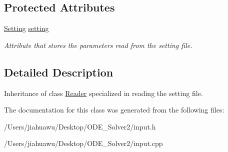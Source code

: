 \subsection*{Protected Attributes}
\begin{DoxyCompactItemize}
\item 
\mbox{\label{class_setting___reader_a5684da80f00261842f462606a1bfd5c8}} 
\mbox{\hyperlink{struct_setting}{Setting}} \mbox{\hyperlink{class_setting___reader_a5684da80f00261842f462606a1bfd5c8}{setting}}
\begin{DoxyCompactList}\small\item\em Attribute that stores the parameters read from the setting file. \end{DoxyCompactList}\end{DoxyCompactItemize}


\subsection{Detailed Description}
Inheritance of class \mbox{\hyperlink{class_reader}{Reader}} specialized in reading the setting file. 

The documentation for this class was generated from the following files\+:\begin{DoxyCompactItemize}
\item 
/\+Users/jiahuawu/\+Desktop/\+O\+D\+E\+\_\+\+Solver2/input.\+h\item 
/\+Users/jiahuawu/\+Desktop/\+O\+D\+E\+\_\+\+Solver2/input.\+cpp\end{DoxyCompactItemize}
